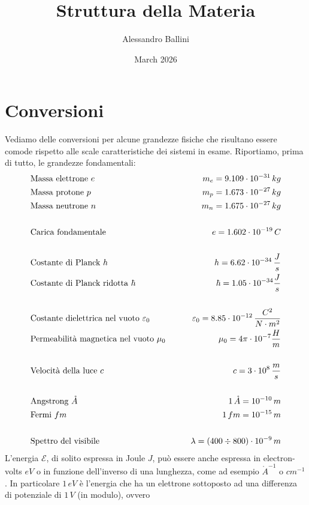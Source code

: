 \documentclass{article}
\title{Struttura della Materia}
\author{Alessandro Ballini}
\date{March 2026}
\begin{document}
\maketitle
\tableofcontents
\newpage

\section*{Conversioni}
Vediamo delle conversioni per alcune grandezze fisiche che risultano essere comode rispetto alle scale caratteristiche dei sistemi in esame. Riportiamo, prima di tutto, le grandezze fondamentali:
\begin{align}
    &\text{Massa elettrone $e$} \qquad &m_e = 9.109 \cdot 10^{-31} \, kg \notag \\
    &\text{Massa protone $p$} \qquad &m_p = 1.673 \cdot 10^{-27} \, kg \notag \\
    &\text{Massa neutrone $n$} \qquad &m_n = 1.675 \cdot 10^{-27} \, kg \notag \\
    \notag \\
    &\text{Carica fondamentale} \qquad &e = 1.602 \cdot 10^{-19} \, C \notag \\
    \notag \\
    &\text{Costante di Planck $h$} \qquad &h = 6.62 \cdot 10^{-34} \, \frac{J}{s} \notag \\
    &\text{Costante di Planck ridotta $\hbar$} \qquad &\hbar = 1.05 \cdot 10^{-34} \frac{J}{s} \notag \\
    \notag \\
    &\text{Costante dielettrica nel vuoto $\varepsilon_0$} \qquad &\varepsilon_0 = 8.85 \cdot 10^{-12} \, \frac{C^2}{N\cdot m^2} \notag \\
    &\text{Permeabilità magnetica nel vuoto $\mu_0$} \qquad &\mu_0 = 4\pi \cdot 10^{-7} \frac{H}{m} \notag \\
    \notag \\
    &\text{Velocità della luce $c$} \qquad &c = 3 \cdot 10^8 \, \frac{m}{s} \notag \\
    \notag \\
    &\text{Angstrong $\mathring{A}$} \qquad &1 \, \mathring{A} = 10^{-10} \, m \notag \\
    &\text{Fermi $fm$} \qquad &1 \, fm = 10^{-15} \, m \notag \\
    \notag \\
    &\text{Spettro del visibile} \qquad &\lambda = (400 \div 800) \cdot 10^{-9} \, m \notag
\end{align}
L'energia $\mathcal{E}$, di solito espressa in Joule $J$, può essere anche espressa in electron-volts $eV$ o in funzione dell'inverso di una lunghezza, come ad esempio $\mathring{A}^{-1}$ o $cm^{-1}$. In particolare $1 \, eV$ è l'energia che ha un elettrone sottoposto ad una differenza di potenziale di $1 \, V$ (in modulo), ovvero
\end{document}
